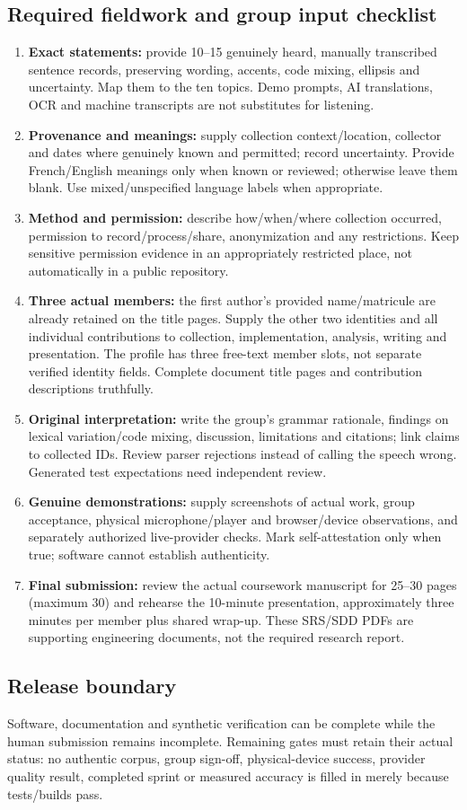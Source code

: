 \documentclass[11pt,a4paper]{article}
\begin{document}
\subsection{Required fieldwork and group input checklist}
\begin{enumerate}
\item \textbf{Exact statements:} provide 10--15 genuinely heard, manually
transcribed sentence records, preserving wording, accents, code mixing,
ellipsis and uncertainty. Map them to the ten topics. Demo prompts, AI
translations, OCR and machine transcripts are not substitutes for listening.
\item \textbf{Provenance and meanings:} supply collection context/location,
collector and dates where genuinely known and permitted; record uncertainty.
Provide French/English meanings only when known or reviewed; otherwise leave
them blank. Use mixed/unspecified language labels when appropriate.
\item \textbf{Method and permission:} describe how/when/where collection
occurred, permission to record/process/share, anonymization and any
restrictions. Keep sensitive permission evidence in an appropriately
restricted place, not automatically in a public repository.
\item \textbf{Three actual members:} the first author's provided name/matricule
are already retained on the title pages. Supply the other two identities and all individual
contributions to collection, implementation, analysis, writing and presentation.
The profile has three free-text member slots, not separate verified identity
fields. Complete document title pages and contribution descriptions truthfully.
\item \textbf{Original interpretation:} write the group's grammar rationale,
findings on lexical variation/code mixing, discussion, limitations and
citations; link claims to collected IDs. Review parser rejections instead of
calling the speech wrong. Generated test expectations need independent review.
\item \textbf{Genuine demonstrations:} supply screenshots of actual work,
group acceptance, physical microphone/player and browser/device observations,
and separately authorized live-provider checks. Mark self-attestation only
when true; software cannot establish authenticity.
\item \textbf{Final submission:} review the actual coursework manuscript for
25--30 pages (maximum 30) and rehearse the 10-minute presentation, approximately
three minutes per member plus shared wrap-up. These SRS/SDD PDFs are supporting
engineering documents, not the required research report.
\end{enumerate}

\subsection{Release boundary}
Software, documentation and synthetic verification can be complete while
the human submission remains incomplete. Remaining gates must retain their
actual status: no authentic corpus, group sign-off, physical-device success,
provider quality result, completed sprint or measured accuracy is filled in
merely because tests/builds pass.
\end{document}
